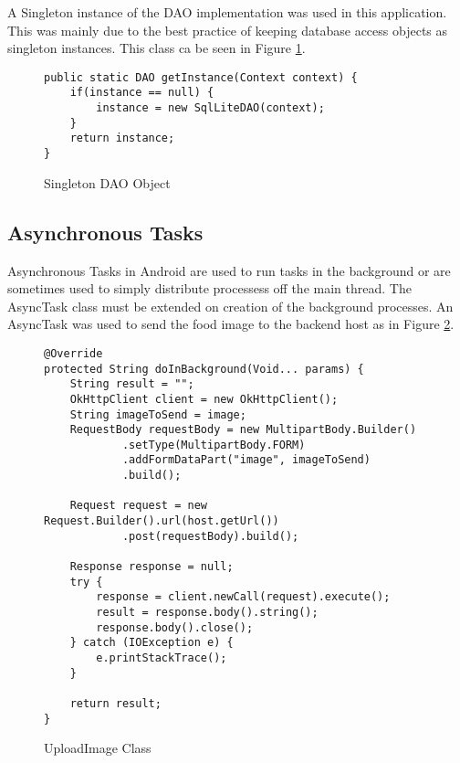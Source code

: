 A Singleton instance of the DAO implementation was used in this application.
This was mainly due to the best practice of keeping database access objects as singleton instances.
This class ca be seen in Figure \ref{lst:singletonDao}.

\begin{figure}[h]
\caption{Singleton DAO Object}
\label{lst:singletonDao}
\begin{lstlisting}[style=Java]
public static DAO getInstance(Context context) {
    if(instance == null) {
        instance = new SqlLiteDAO(context);
    }
    return instance;
}
\end{lstlisting}
\end{figure}

\tocless\subsection{Asynchronous Tasks}
Asynchronous Tasks in Android are used to run tasks in the background or are sometimes used to simply distribute processess off the main thread.
The AsyncTask class must be extended on creation of the background processes.
An AsyncTask was used to send the food image to the backend host as in Figure \ref{lst:rrCode}.
\begin{figure}[h]
\caption{UploadImage Class}
\label{lst:rrCode}
\begin{lstlisting}[style=Java]
@Override
protected String doInBackground(Void... params) {
    String result = "";
    OkHttpClient client = new OkHttpClient();
    String imageToSend = image;
    RequestBody requestBody = new MultipartBody.Builder()
            .setType(MultipartBody.FORM)
            .addFormDataPart("image", imageToSend)
            .build();

    Request request = new Request.Builder().url(host.getUrl())
            .post(requestBody).build();

    Response response = null;
    try {
        response = client.newCall(request).execute();
        result = response.body().string();
        response.body().close();
    } catch (IOException e) {
        e.printStackTrace();
    }

    return result;
}
\end{lstlisting}
\end{figure}

